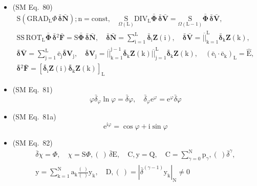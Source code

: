 \documentclass[
    12pt,              %
    a4paper,           %
    headings=normal,   %
    twoside=true,      %
    BCOR=8mm,          %
]{scrbook}
\begin{document}
\begin{itemize}[label={},leftmargin=0pt]
    \item (SM Eq.\ 80) 
    \[
    \begin{gathered}
    \mathrm{S}(\mathrm{GRAD}_\mathrm{L} \Phi \,\bar{\bm{\delta}}\bar{\mathbf{N}});\mathrm{n} = \mathrm{const}, \quad \underset{\Omega(\mathrm{L})}{\mathrm{S}}\mathrm{DIV}_\mathrm{L} \bar{\bm{\Phi}}\,\bar{\bm{\delta}}\bar{\mathbf{V}} = \underset{\Omega(\mathrm{L}-1)}{\mathrm{S}}\bar{\bm{\Phi}}\,\bar{\bm{\delta}}\bar{\mathbf{V}}, \\
    \mathrm{SS}\,\mathrm{ROT}_\mathrm{L} \bar{\bm{\Phi}}\,\bar{\bm{\delta}}{}^2\bar{\mathbf{F}} = \mathrm{S}\bar{\bm{\Phi}}\,\bar{\bm{\delta}}\bar{\mathbf{N}}, \quad \bar{\bm{\delta}}\bar{\mathbf{N}} = \sum_{\mathrm{i}=1}^\mathrm{L} \bar{\bm{\delta}}_\mathrm{i} \mathbf{Z}(\mathrm{i}), \quad \bar{\bm{\delta}}\bar{\mathbf{V}} = \overline{||}_{\mathrm{k}=1}^\mathrm{L} \bar{\bm{\delta}}_\mathrm{k} \mathbf{Z}(\mathrm{k}), \\
    \bar{\bm{\delta}}\bar{\mathbf{V}} = \sum_{\mathrm{j}=1}^\mathrm{L} \bar{\mathrm{e}}_\mathrm{j} \bar{\bm{\delta}}\mathbf{V}_\mathrm{j}, \quad \bar{\bm{\delta}}\mathbf{V}_\mathrm{j} = \overline{||}_{\mathrm{k}=1}^{\mathrm{j}-1}\bar{\bm{\delta}}_\mathrm{k} \mathbf{Z}(\mathrm{k}) \overline{||}_{\mathrm{j}=1}^\mathrm{L} \bar{\bm{\delta}}_\mathrm{k} \mathbf{Z}(\mathrm{k}), \quad (\bar{\mathrm{e}}_\mathrm{i} \cdot \bar{\mathrm{e}}_\mathrm{k})_\mathrm{L} = \hat{\mathrm{E}}, \\
    \bar{\bm{\delta}}{}^2\bar{\mathbf{F}} = \left[ \bar{\bm{\delta}}_\mathrm{i} \mathbf{Z}(\mathrm{i}) \bar{\bm{\delta}}_\mathrm{k} \mathbf{Z}(\mathrm{k}) \right]_\mathrm{L}
    \end{gathered}
    \]

    \item (SM Eq.\ 81) 
    \[
    \varphi \bar{\delta}_\varphi \ln \varphi = \bar{\delta} \varphi, \quad \bar{\delta}_\varphi \mathrm{e}^\varphi = \mathrm{e}^\varphi \bar{\delta}\varphi
    \]

    \item (SM Eq.\ 81a) 
    \[
    \mathrm{e}^{\mathrm{i}\varphi} = \cos\varphi + \mathrm{i}\sin\varphi
    \]

    \item (SM Eq.\ 82) 
    \[
    \begin{gathered}
    \bar{\delta}\chi = \Phi, \quad \chi = \mathrm{S}\Phi, (\ )\,\bar{\delta}\mathrm{E}, \quad \mathrm{C}, \mathrm{y} = \mathrm{Q}, \quad \mathrm{C} = \sum_{\gamma=0}^\mathrm{N} \mathrm{p}_\gamma, (\ )\bar{\delta}^\gamma, \\
    \mathrm{y} = \sum_{\mathrm{k}=1}^\mathrm{N} \mathrm{a_k} \frac{(\ )}{(\ )} \mathrm{y_k}, \quad \mathrm{D}, (\ ) = \left| \bar{\delta}^{(\gamma-1)} \mathrm{y_k} \right|_\mathrm{N} \ne 0
    \end{gathered}
    \]


\end{itemize}
\end{document}
